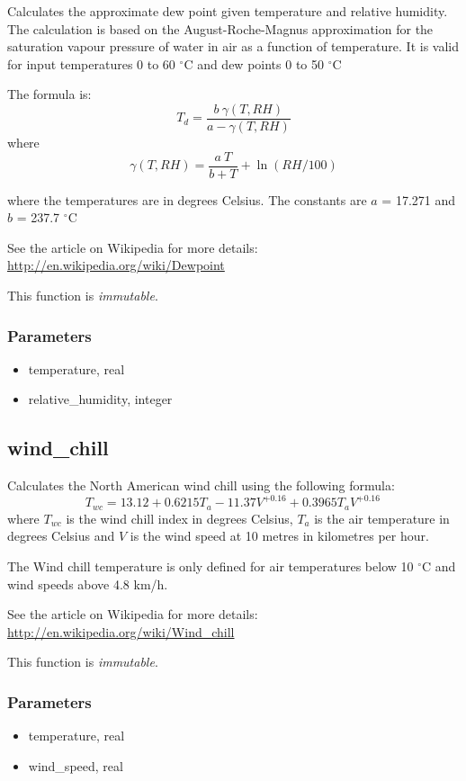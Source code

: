 \documentclass[a4paper,10pt]{book}
\begin{document}
Calculates the approximate dew point given temperature and relative humidity. The calculation is based on the August-Roche-Magnus approximation for the saturation vapour pressure of water in air as a function of temperature. It is valid for input temperatures 0 to 60 $^{\circ}$C and dew points 0 to 50 $^{\circ}$C

The formula is:
$$T_d = \frac {b\ \gamma(T,RH)} {a - \gamma(T,RH)}$$
where
$$\gamma(T,RH) = \frac {a\ T} {b+T} + \ln (RH/100)$$

where the temperatures are in degrees Celsius. The constants are $a$ = 17.271 and $b$ = 237.7 $^{\circ}$C

See the article on Wikipedia for more details: \url{http://en.wikipedia.org/wiki/Dewpoint}

This function is \emph{immutable}.

\subsubsection{Parameters}
\begin{itemize}
\item temperature, real
\item relative\_humidity, integer
\end{itemize}

\subsection{wind\_chill}
\label{wind_chill}
Calculates the North American wind chill using the following formula:
$$T_{wc}=13.12 + 0.6215 T_a-11.37 V^{+0.16} + 0.3965 T_a V^{+0.16}\,\!$$
where $T_{wc}$ is the wind chill index in degrees Celsius, $T_a$ is the air temperature in degrees Celsius and $V$ is the wind speed at 10 metres in kilometres per hour.

The Wind chill temperature is only defined for air temperatures below 10 $^{\circ}$C and wind speeds above 4.8 km/h.

See the article on Wikipedia for more details:
\url{http://en.wikipedia.org/wiki/Wind_chill}

This function is \emph{immutable}.

\subsubsection{Parameters}
\begin{itemize}
\item temperature, real
\item wind\_speed, real
\end{itemize}
\end{document}
